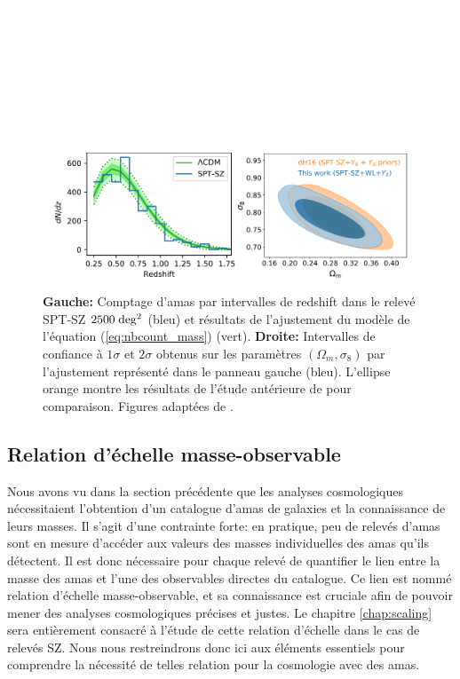 \begin{figure}[t]
    \centering
    \includegraphics[width=\linewidth]{Figures/Chap_amas/bocquet.pdf}
    \caption{
        \textbf{Gauche:} Comptage d'amas par intervalles de redshift dans le relevé SPT-SZ $2500 \;{\rm deg^2}$ (bleu) et résultats de l'ajustement du modèle de l'équation (\ref{eq:nbcount_mass}) (vert).
        \textbf{Droite:} Intervalles de confiance à $1\sigma$ et $2\sigma$ obtenus sur les paramètres $(\Omega_m, \sigma_8)$ par l'ajustement représenté dans le panneau gauche (bleu).
        L'ellipse orange montre les résultats de l'étude antérieure de \cite{de_haan_cosmological_2016} pour comparaison.
        Figures adaptées de \cite{bocquet_cluster_2019}.
    }
    \label{fig:nbcount_bocquet}
\end{figure}

\subsection{Relation d'échelle masse-observable}\label{sec:scaling}

Nous avons vu dans la section précédente que les analyses cosmologiques nécessitaient l'obtention d'un catalogue d'amas de galaxies et la connaissance de leurs masses.
Il s'agit d'une contrainte forte: en pratique, peu de relevés d'amas sont en mesure d'accéder aux valeurs des masses individuelles des amas qu'ils détectent.
Il est donc nécessaire pour chaque relevé de quantifier le lien entre la masse des amas et l'une des observables directes du catalogue.
Ce lien est nommé relation d'échelle masse-observable, et sa connaissance est cruciale afin de pouvoir mener des analyses cosmologiques précises et justes.
Le chapitre \ref{chap:scaling} sera entièrement consacré à l'étude de cette relation d'échelle dans le cas de relevés SZ.
Nous nous restreindrons donc ici aux éléments essentiels pour comprendre la nécessité de telles relation pour la cosmologie avec des amas.

